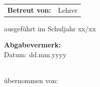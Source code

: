 \begin{titlepage}
\begin{center}
        \begin{tabular}{ll}
            \textbf{Betreut von:} & Lehrer\\
        \end{tabular}
        \vspace{1.5cm}
        
        ausgeführt im Schuljahr xx/xx
        
        \vspace{1.0cm}

    \end{center}

    \vfill
\noindent
\begin{minipage}[t]{0.5\textwidth}   %
    \textbf{Abgabevermerk:} \\
    Datum: dd.mm.yyyy
\end{minipage}
\begin{minipage}[t]{0.5\textwidth}   %
    \raggedleft
    \textbf{} \\
    übernommen von: \\
\end{minipage}


\end{titlepage}
